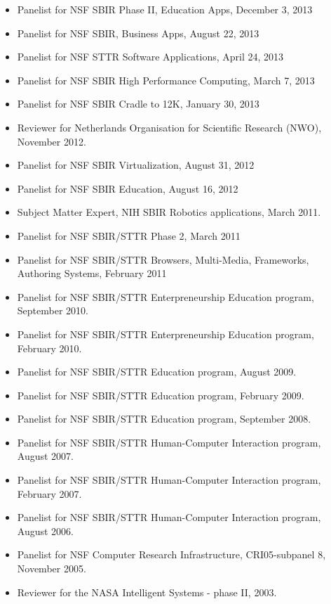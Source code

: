 \begin{itemize}
\item Panelist for NSF SBIR Phase II, Education Apps, December 3, 2013

\item Panelist for NSF SBIR, Business Apps, August 22, 2013

\item Panelist for NSF STTR Software Applications, April 24, 2013  

\item Panelist for NSF SBIR High Performance Computing, March 7, 2013  

\item Panelist for NSF SBIR Cradle to 12K, January 30, 2013  

\item Reviewer for Netherlands Organisation for Scientific Research (NWO), November 2012.

\item Panelist for NSF SBIR Virtualization, August 31, 2012  
  
\item Panelist for NSF SBIR Education, August 16, 2012
  
\item Subject Matter Expert, NIH SBIR Robotics applications, March 2011.

\item Panelist for NSF SBIR/STTR Phase 2, March 2011

\item Panelist for NSF SBIR/STTR Browsers, Multi-Media, Frameworks, Authoring Systems, February 2011

\item Panelist for NSF SBIR/STTR Enterpreneurship Education program, September 2010.

\item Panelist for NSF SBIR/STTR Enterpreneurship Education program, February 2010.

\item Panelist for NSF SBIR/STTR Education program, August 2009.

\item Panelist for NSF SBIR/STTR Education program, February 2009.

\item Panelist for NSF SBIR/STTR Education program, September 2008.

\item Panelist for NSF SBIR/STTR Human-Computer Interaction program, August 2007.

\item Panelist for NSF SBIR/STTR Human-Computer Interaction program, February 2007.

\item Panelist for NSF SBIR/STTR Human-Computer Interaction program, August 2006.

\item Panelist for NSF Computer Research Infrastructure, CRI05-subpanel 8, November 2005.

\item Reviewer for the NASA Intelligent Systems - phase II, 2003. 

\end{itemize}
